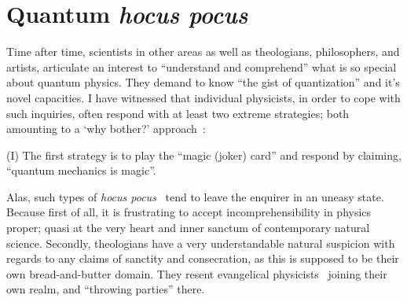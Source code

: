 







\section{Quantum {\it hocus pocus}}

Time after time, scientists in other areas  as well as theologians, philosophers, and artists, articulate an interest to ``understand and comprehend''
what is so special about quantum physics.
They demand to know ``the gist of quantization'' and it's novel capacities.
I have witnessed that
individual physicists, in order to cope with such inquiries, often respond with at least two extreme strategies; both
amounting to a `why bother?' approach~\cite{bell-a}:

(I) The first strategy is to play the ``magic (joker) card'' and respond by claiming,
``quantum mechanics is magic''.

Alas, such types of {\it hocus pocus}~\cite{svozil-2016-quantum-hokus-pokus} tend to leave the enquirer
in an uneasy state. Because first of all, it is frustrating to accept incomprehensibility
in physics proper; quasi at the very heart and inner sanctum of contemporary natural science.
Secondly, theologians have a very understandable natural suspicion with regards to any claims of sanctity and consecration,
as this is supposed to be their own bread-and-butter domain. They resent evangelical physicists~\cite{clauser-talkvie}
joining their own realm, and ``throwing parties'' there.

